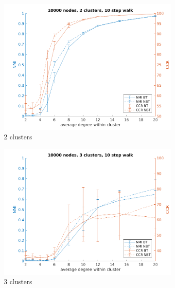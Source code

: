\documentclass{article} %
\begin{document}
\begin{figure}[H] %
    \begin{subfigure}{0.33\textwidth}
        \includegraphics[width=\linewidth]{fig4/N10000K2len10}
        \caption{2 clusters}
        \label{fig:subim41}
    \end{subfigure}
    \begin{subfigure}{0.33\textwidth}
        \includegraphics[width=\linewidth]{fig4/N10000K3len10}
        \caption{3 clusters}
        \label{fig:subim42}
    \end{subfigure}
    \begin{subfigure}{0.33\textwidth}

\end{subfigure}
\end{figure}
\end{document}
